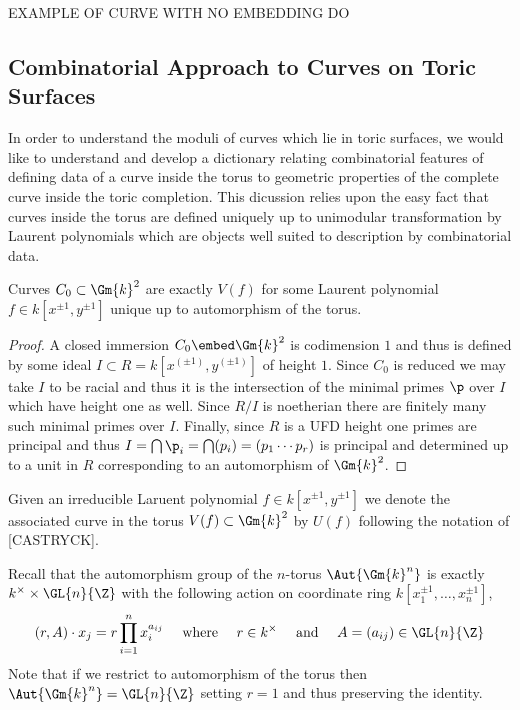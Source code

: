 \documentclass[12pt]{article}
\begin{document}
\begin{example}
EXAMPLE OF CURVE WITH NO EMBEDDING DO
\end{example}


\subsection{Combinatorial Approach to Curves on Toric Surfaces}

In order to understand the moduli of curves which lie in toric surfaces, we would like to understand and develop a dictionary relating combinatorial features of defining data of a curve inside the torus to geometric properties of the complete curve inside the toric completion. This dicussion relies upon the easy fact that curves inside the torus are defined uniquely up to unimodular transformation by Laurent polynomials which are objects well suited to description by combinatorial data.

\begin{prop}
Curves $C_0 \subset \Gm{k}^2$ are exactly $V(f)$ for some Laurent polynomial $f \in k[x^{\pm 1}, y^{\pm 1}]$ unique up to automorphism of the torus.
\end{prop}

\begin{proof}
A closed immersion $C_0 \embed \Gm{k}^2$ is codimension $1$ and thus is defined by some ideal $I \subset R = k[x^(\pm 1), y^(\pm 1)]$ of height $1$. Since $C_0$ is reduced we may take $I$ to be racial and thus it is the intersection of the minimal primes $\p$ over $I$ which have height one as well. Since $R/I$ is noetherian there are finitely many such minimal primes over $I$. Finally, since $R$ is a UFD height one primes are principal and thus $I = \bigcap \p_i = \bigcap (p_i) = (p_1 \cdots p_r)$ is principal and determined up to a unit in $R$ corresponding to an automorphism of $\Gm{k}^2$.
\end{proof}
\noindent
Given an irreducible Laruent polynomial $f \in k[x^{\pm 1}, y^{\pm 1}]$ we denote the associated curve in the torus $V(f) \subset \Gm{k}^2$ by $U(f)$ following the notation of [CASTRYCK]. 

\begin{rmk}
Recall that the automorphism group of the $n$-torus $\Aut{\Gm{k}^n}$ is exactly $k^\times \times \GL{n}{\Z}$ with the following action on coordinate ring $k[x_1^{\pm 1}, \dots, x_n^{\pm 1}]$,
\begin{equation}
(r,  A) \cdot x_j = r \prod_{i = 1}^n x_i^{a_{ij}} \quad \text{ where } \quad r \in k^\times \quad \text{ and } \quad A = (a_{ij}) \in \GL{n}{\Z} 
\end{equation}
Note that if we restrict to automorphism of the torus  then $\Aut{\Gm{k}^n} = \GL{n}{\Z}$ setting $r = 1$ and thus preserving the identity. 
\end{rmk}
\end{document}
